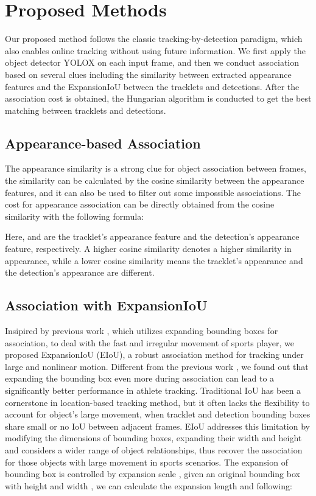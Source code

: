 \documentclass[10pt,twocolumn,letterpaper]{article}
\begin{document}
\section{Proposed Methods}
Our proposed method follows the classic tracking-by-detection paradigm, which also enables online tracking without using future information. We first apply the object detector YOLOX on each input frame, and then we conduct association based on several clues including the similarity between extracted appearance features and the ExpansionIoU between the tracklets and detections. After the association cost is obtained, the Hungarian algorithm is conducted to get the best matching between tracklets and detections.

\subsection{Appearance-based Association}
The appearance similarity is a strong clue for object association between frames, the similarity can be calculated by the cosine similarity between the appearance features, and it can also be used to filter out some impossible associations. The cost for appearance association  can be directly obtained from the cosine similarity with the following formula:


Here,  and  are the tracklet's appearance feature and the detection's appearance feature, respectively. A higher cosine similarity denotes a higher similarity in appearance, while a lower cosine similarity means the tracklet's appearance and the detection's appearance are different.

\subsection{Association with ExpansionIoU}
Insipired by previous work \cite{yang2023hard}, which utilizes expanding bounding boxes for association, to deal with the fast and irregular movement of sports player, we proposed ExpansionIoU (EIoU), a robust association method for tracking under large and nonlinear motion.
Different from the previous work \cite{yang2023hard}, we found out that expanding the bounding box even more during association can lead to a significantly better performance in athlete tracking.
Traditional IoU has been a cornerstone in location-based tracking method, but it often lacks the flexibility to account for object's large movement, when tracklet and detection bounding boxes share small or no IoU between adjacent frames. EIoU addresses this limitation by modifying the dimensions of bounding boxes, expanding their width and height and considers a wider range of object relationships, thus recover the association for those objects with large movement in sports scenarios. 
The expansion of bounding box is controlled by expansion scale , given an original bounding box with height  and width , we can calculate the expansion length  and  following:
\end{document}
